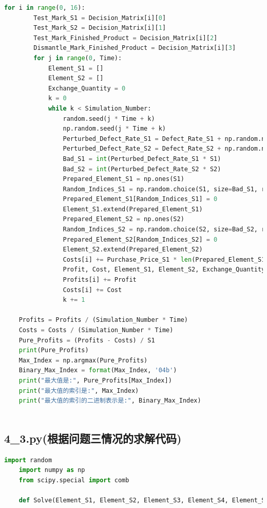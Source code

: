 \documentclass[withoutpreface,bwprint]{cumcmthesis} %
\begin{document}
\begin{appendices}
\begin{lstlisting}[language=python]
	for i in range(0, 16):
		Test_Mark_S1 = Decision_Matrix[i][0]
		Test_Mark_S2 = Decision_Matrix[i][1]
		Test_Mark_Finished_Product = Decision_Matrix[i][2]
		Dismantle_Mark_Finished_Product = Decision_Matrix[i][3]
		for j in range(0, Time):
			Element_S1 = []
			Element_S2 = []
			Exchange_Quantity = 0
			k = 0
			while k < Simulation_Number:
				random.seed(j * Time + k)
				np.random.seed(j * Time + k)
				Perturbed_Defect_Rate_S1 = Defect_Rate_S1 + np.random.normal(0, 0.01)
				Perturbed_Defect_Rate_S2 = Defect_Rate_S2 + np.random.normal(0, 0.01)
				Bad_S1 = int(Perturbed_Defect_Rate_S1 * S1)
				Bad_S2 = int(Perturbed_Defect_Rate_S2 * S2)
				Prepared_Element_S1 = np.ones(S1)
				Random_Indices_S1 = np.random.choice(S1, size=Bad_S1, replace=False)
				Prepared_Element_S1[Random_Indices_S1] = 0
				Element_S1.extend(Prepared_Element_S1)
				Prepared_Element_S2 = np.ones(S2)
				Random_Indices_S2 = np.random.choice(S2, size=Bad_S2, replace=False)
				Prepared_Element_S2[Random_Indices_S2] = 0
				Element_S2.extend(Prepared_Element_S2)
				Costs[i] += Purchase_Price_S1 * len(Prepared_Element_S1) + Purchase_Price_S2 * len(Prepared_Element_S2)
				Profit, Cost, Element_S1, Element_S2, Exchange_Quantity = Solve(Element_S1, Element_S2, Test_Mark_S1, Test_Mark_S2, Test_Mark_Finished_Product, Dismantle_Mark_Finished_Product, Exchange_Quantity)
				Profits[i] += Profit
				Costs[i] += Cost
				k += 1
	
	Profits = Profits / (Simulation_Number * Time)
	Costs = Costs / (Simulation_Number * Time)
	Pure_Profits = (Profits - Costs) / S1
	print(Pure_Profits)
	Max_Index = np.argmax(Pure_Profits)
	Binary_Max_Index = format(Max_Index, '04b')
	print("最大值是:", Pure_Profits[Max_Index])
	print("最大值的索引是:", Max_Index)
	print("最大值的索引的二进制表示是:", Binary_Max_Index)
	
\end{lstlisting}
\subsection{4\_3.py(根据问题三情况的求解代码)}
\begin{lstlisting}[language=python]
	import random
	import numpy as np
	from scipy.special import comb
	
	def Solve(Element_S1, Element_S2, Element_S3, Element_S4, Element_S5, Element_S6, Element_S7, Element_S8, Semi_Finished_Product_S1, Semi_Finished_Product_S2, Semi_Finished_Product_S3, Semi_Finished_Product_S1_Form, Semi_Finished_Product_S2_Form, Semi_Finished_Product_S3_Form, Decision_Vector, Exchange_Quantity):
	

\end{lstlisting}
\end{appendices}
\end{document}

